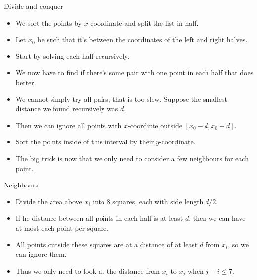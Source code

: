 \documentclass{beamer}
\begin{document}
\begin{frame}[plain]{Divide and conquer}
	\begin{itemize}
        \item We sort the points by $x$-coordinate and split the list in half.
        \item Let $x_0$ be such that it's between the coordinates of the left and right halves.
        \item Start by solving each half recursively.
        \item We now have to find if there's some pair with one point in each half that does better.
        \item We cannot simply try all pairs, that is too slow. Suppose the smallest distance we found recursively was $d$.
        \item Then we can ignore all points with $x$-coordinte outside $[x_0 - d, x_0 + d]$.
        \item Sort the points inside of this interval by their $y$-coordinate.
        \item The big trick is now that we only need to consider a few neighbours for each point.
    \end{itemize}
\end{frame}

\begin{frame}[plain]{Neighbours}
	\begin{itemize}
        \item Divide the area above $x_i$ into 8 squares, each with side length $d/2$.
        \item If he distance between all points in each half is at least $d$, then we can have at most each point per square.
        \item All points outside these squares are at a distance of at least $d$ from $x_i$, so we can ignore them.
        \item Thus we only need to look at the distance from $x_i$ to $x_j$ when $j - i \leq 7$.
    \end{itemize}
\end{frame}
\end{document}
